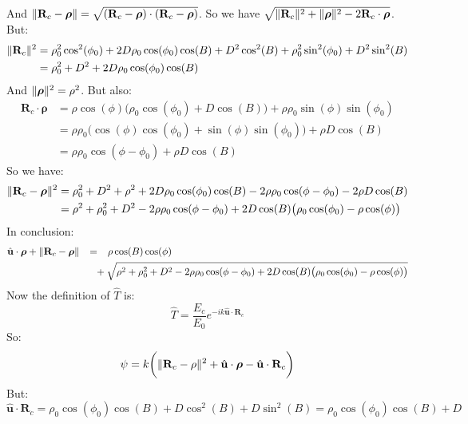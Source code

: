 \documentclass{article}
\theoremstyle{mystyle}
\DeclarePairedDelimiter\norm{\lVert}{\rVert}
\begin{document}
And $\norm{\mathbf{R}_{c}-\boldsymbol{\rho}} = \sqrt{(\mathbf{R}_{c}-\boldsymbol{\rho})\cdot(\mathbf{R}_{c}-\boldsymbol{\rho})}$. So we have $\sqrt{\norm{\mathbf{R}_{c}}^2+\norm{\boldsymbol{\rho}}^2-2\mathbf{R}_{c}\cdot\boldsymbol{\rho}}$. But:
\begin{align*}
\nonumber \norm{\mathbf{R}_{c}}^2 &= \rho_{0}^2\cos^2(\phi_0)+2D\rho_{0}\cos(\phi_0)\cos(B)+D^2\cos^2(B) + \rho_{0}^2\sin^2(\phi_0)+D^2\sin^2(B) \\
&= \rho_{0}^2+D^2+2D\rho_{0}\cos(\phi_0)\cos(B)
\end{align*}
And $\norm{\boldsymbol{\rho}}^2 = \rho^2$. But also:
\begin{align*}
\nonumber \mathbf{R}_{c}\cdot \boldsymbol{\rho} &= \rho\cos(\phi)\big(\rho_{0}\cos(\phi_{0})+D\cos(B)\big)+\rho\rho_{0}\sin(\phi)\sin(\phi_{0})\\
\nonumber &= \rho\rho_{0}\big(\cos(\phi)\cos(\phi_{0})+\sin(\phi)\sin(\phi_{0})\big)+\rho D\cos(B)\\
&= \rho\rho_{0}\cos(\phi-\phi_{0})+\rho D\cos(B)
\end{align*}
So we have:
\begin{align*}
\nonumber \norm{\mathbf{R}_{c}-\boldsymbol{\rho}}^2 &= \rho_{0}^2+D^2+\rho^2+2D\rho_{0}\cos(\phi_{0})\cos(B)-2\rho\rho_{0}\cos(\phi-\phi_{0})-2\rho D\cos(B)\\
&=\rho^2+\rho_{0}^2+D^2-2\rho\rho_{0}\cos(\phi-\phi_{0}) + 2D\cos(B)\big(\rho_{0}\cos(\phi_0)-\rho\cos(\phi)\big)
\end{align*}
In conclusion:
\begin{align*}
    \hat{\mathbf{u}}\cdot \boldsymbol{\rho} + \norm{\mathbf{R}_{c}-\boldsymbol{\rho}} &\phantom{+}=\phantom{+}\rho\cos(B)\cos(\phi)\\
    &\phantom{+}\phantom{=}+\sqrt{\rho^2+\rho_{0}^2 + D^2 - 2\rho\rho_{0}\cos(\phi - \phi_{0}) + 2D\cos(B)\big(\rho_{0}\cos(\phi_0) - \rho\cos(\phi)\big)}
\end{align*}
Now the definition of $\hat{T}$ is:
\begin{equation*}
\hat{T} = \frac{E_{c}}{E_{0}}e^{-ik\hat{\mathbf{u}}\cdot\mathbf{R}_{c}}
\end{equation*}
So:
\begin{equation*}
\psi = k\bigg(\norm{\mathbf{R}_{c}-\rho}^2 + \hat{\mathbf{u}}\cdot\boldsymbol{\rho} - \hat{\mathbf{u}}\cdot \mathbf{R}_{c}\bigg)    
\end{equation*}
But:
\begin{equation*}
\hat{\mathbf{u}}\cdot \mathbf{R}_{c} = \rho_{0}\cos(\phi_0)\cos(B) + D\cos^2(B) + D\sin^2(B) = \rho_{0}\cos(\phi_0)\cos(B)+D    
\end{equation*}
\end{document}
